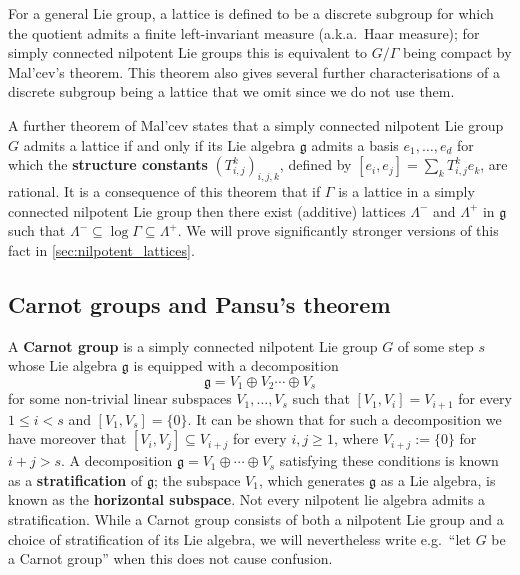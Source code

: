 \begin{remark}
For a general Lie group, a lattice is defined to be a discrete subgroup for which the quotient admits a finite left-invariant measure (a.k.a.\ Haar measure); for simply connected nilpotent Lie groups this is equivalent to $G/\Gamma$ being compact by Mal'cev's theorem.
This theorem also gives several further characterisations of a discrete subgroup being a lattice that we omit since we do not use them.
\end{remark}



A further theorem of Mal'cev \cite[Theorem 2.12]{raghunathan1972discrete} states that a simply connected nilpotent Lie group $G$ admits a lattice if and only if its Lie algebra $\mathfrak{g}$ admits a basis $e_1,\ldots,e_d$ for which the \textbf{structure constants} $(T_{i,j}^k)_{i,j,k}$, defined by $[e_i,e_j]=\sum_k T_{i,j}^k e_k$,  are rational. It is a consequence of this theorem \cite[Proposition 2.3.7]{Wang2023} that if $\Gamma$ is a lattice in a simply connected nilpotent Lie group then there exist (additive) lattices $\Lambda^-$ and $\Lambda^+$ in $\mathfrak{g}$ such that $\Lambda^- \subseteq \log \Gamma \subseteq \Lambda^+$. We will prove significantly stronger versions of this fact in \cref{sec:nilpotent_lattices}.
%




\subsection{Carnot groups and Pansu's theorem}
\label{subsec:Carnot_background}

A \textbf{Carnot group} is a simply connected nilpotent Lie group $G$ of some step $s$ whose Lie algebra $\mathfrak{g}$ is equipped with a decomposition
\[
\mathfrak{g}=V_1 \oplus V_2 \cdots \oplus V_s
\]
for some non-trivial linear subspaces $V_1,\ldots,V_s$ such that $[V_1,V_i]=V_{i+1}$ for every $1\leq i <s$ and $[V_1,V_s]=\{0\}$. 
It can be shown that
for such a decomposition we have moreover that $[V_i,V_j]\subseteq V_{i+j}$ for every $i,j \geq 1$, where $V_{i+j}:=\{0\}$ for $i+j>s$. A decomposition $\mathfrak{g}=V_1\oplus \cdots \oplus V_s$ satisfying these conditions is known as a \textbf{stratification} of $\mathfrak{g}$; the subspace $V_1$, which generates $\mathfrak{g}$ as a Lie algebra, is known as the \textbf{horizontal subspace}. Not every nilpotent lie algebra admits a stratification. While a Carnot group consists of both a nilpotent Lie group and a choice of stratification of its Lie algebra, we will nevertheless write e.g.\ ``let $G$ be a Carnot group'' when this does not cause confusion.

